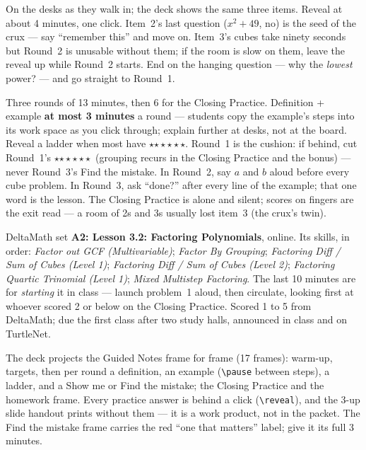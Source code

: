 \documentclass[10pt]{article}
\newcommand{\rung}[1]{{\color{goldacc}\ifcase#1\or$\star$\or$\star\star$\or$\star\star\star$\fi}}
\begin{document}
\begin{teachernote}[Warm-Up]
On the desks as they walk in; the deck shows the same three items. Reveal at about 4 minutes,
one click. Item~2's last question ($x^2+49$, no) is the seed of the crux --- say ``remember
this'' and move on. Item~3's cubes take ninety seconds but Round~2 is unusable without them; if
the room is slow on them, leave the reveal up while Round~2 starts. End on the hanging question
--- why the \emph{lowest} power? --- and go straight to Round~1.
\end{teachernote}

\begin{teachernote}
Three rounds of 13 minutes, then 6 for the Closing Practice. Definition + example \textbf{at
most 3 minutes} a round --- students copy the example's steps into its work space as you click
through; explain further at desks, not at the board. Reveal a ladder when most have \rung2.
Round~1 is the cushion: if behind, cut Round~1's \rung3\ (grouping recurs in the Closing
Practice and the bonus) --- never Round~3's Find the mistake. In Round~2, say $a$ and $b$ aloud
before every cube problem. In Round~3, ask ``done?'' after every line of the example; that one
word is the lesson. The Closing Practice is alone and silent; scores on fingers are the exit
read --- a room of 2s and 3s usually lost item~3 (the crux's twin).
\end{teachernote}

\begin{teachernote}[Homework]
DeltaMath set \textbf{A2: Lesson 3.2: Factoring Polynomials}, online. Its skills, in order: \emph{Factor out GCF (Multivariable)}; \emph{Factor By Grouping}; \emph{Factoring Diff / Sum of Cubes (Level 1)}; \emph{Factoring Diff / Sum of Cubes (Level 2)}; \emph{Factoring Quartic Trinomial (Level 1)}; \emph{Mixed Multistep Factoring}. The last 10 minutes are for \emph{starting} it in class ---
launch problem~1 aloud, then circulate, looking first at whoever scored 2 or below on the
Closing Practice. Scored 1 to 5 from DeltaMath; due the first class after two study halls,
announced in class and on TurtleNet.
\end{teachernote}

\begin{teachernote}[Slides]
The deck projects the Guided Notes frame for frame (17 frames): warm-up, targets, then per round
a definition, an example (\verb|\pause| between steps), a ladder, and a Show me or Find the
mistake; the Closing Practice and the homework frame. Every practice answer is behind a click
(\verb|\reveal|), and the 3-up slide handout prints without them --- it is a work product, not
in the packet. The Find the mistake frame carries the red ``one that matters'' label; give it
its full 3 minutes.
\end{teachernote}
\end{document}
